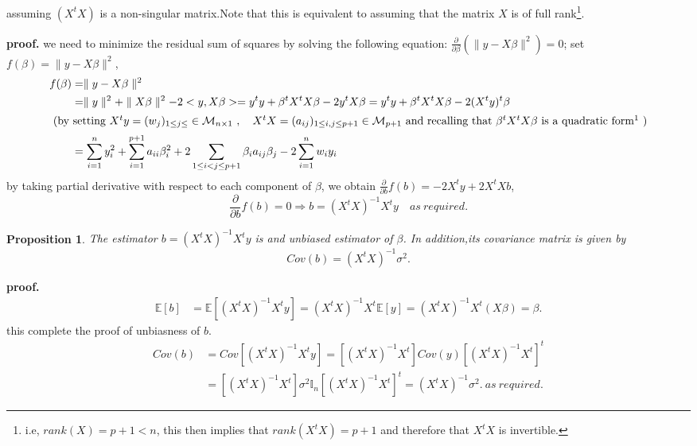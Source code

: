\documentclass[12pt]{report}
\newtheorem {proposition}{Proposition}[section]  %
\begin{document}
	assuming $(X^{t}X)$ is a non-singular matrix.Note that this is equivalent to assuming that the matrix $X$ is of full rank\footnote{i.e, $rank(X)=p+1<n$, this then implies that $rank(X^{t}X)=p+1$ and therefore that $X^{t}X$ is invertible.}.
	
	\textbf{proof.}
	{\selectfont 	we need to minimize the residual sum of squares by solving the following equation: $\frac{\partial}{\partial\beta}(\parallel y-X\beta\parallel ^{2})=0$; set $f(\beta)=\parallel y-X\beta\parallel ^{2}$,
		\begin{align*}
			f(\beta) &=\parallel y-X\beta\parallel ^{2} \\
			&=\parallel y\parallel ^{2} + \parallel X\beta\parallel ^{2} -2<y,X\beta> = y^{t}y + \beta^{t}X^{t}X\beta -2y^{t}X\beta
			= y^{t}y + \beta^{t}X^{t}X\beta -2(X^{t}y)^{t}\beta\\
			\intertext{ (by setting $X^{t}y=(w_{j})_{1\leq j \leq} \in \mathcal{M}_{n\times1}\  ,\quad X^{t}X=(a_{ij})_{1\leq i,j \leq p+1} \in \mathcal{M}_{p+1}$ and recalling that $\beta^{t}X^{t}X\beta$ is a quadratic form\footnote{say, $\sum_{i=1}^{p+1}a_{ii}b_{i}^{2} +2\sum_{1\leq i<j \leq p+1}b_{i}a_{ij}b_{j}$} )}  
			&= \sum_{i=1}^{n}y_{i} ^{2} + \sum_{i=1}^{p+1}a_{ii}\beta_{i}^{2} +2\sum_{1\leq i<j \leq p+1}\beta_{i}a_{ij}\beta_{j} -2\sum_{i=1}^{n}w_{i}y_{i}
		\end{align*}
		by taking partial derivative with respect to each component of $\beta$, we obtain $\frac{\partial}{\partial b}f(b)=-2X^{t}y+2X^{t}Xb$,
		$$\frac{\partial}{\partial b}f(b)=0 \Rightarrow b=(X^{t}X)^{-1}X^{t}y \quad as\  required.$$}
	
	\begin{proposition}
		The estimator $b=(X^{t}X)^{-1}X^{t}y$ is and unbiased estimator of $\beta$. In addition,its covariance matrix is given by $$Cov(b)=(X^{t}X)^{-1}\sigma^{2}.$$
	\end{proposition}
	\label{10}
	\textbf{proof.}
	{\selectfont
		\begin{align*}
			\mathbb{E}[b]&=\mathbb{E}[(X^{t}X)^{-1}X^{t}y]=(X^{t}X)^{-1}X^{t}\mathbb{E}[y]=(X^{t}X)^{-1}X^{t}(X\beta) 
			=\beta.
		\end{align*} this complete the proof of unbiasness of $b$.
		\begin{align*}
			Cov(b)&=Cov[(X^{t}X)^{-1}X^{t}y]=[(X^{t}X)^{-1}X^{t}]Cov(y)[(X^{t}X)^{-1}X^{t}]^{t}\\
			&=[(X^{t}X)^{-1}X^{t}]\sigma^{2}\mathbb{I}_{n}[(X^{t}X)^{-1}X^{t}]^{t}
			=(X^{t}X)^{-1}\sigma^{2}.\ as\ required.
	\end{align*}}
	
\end{document}
